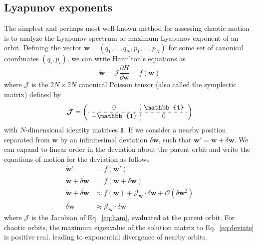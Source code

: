\documentclass[letterpaper,12pt,preprint]{aastex}
\newcommand{\bs}[1]{\boldsymbol{#1}}
\newcommand{\ident}{\mathbb{1}}
\newcommand{\jac}{\mathscr{J}}
\begin{document}
\subsection{Lyapunov exponents} \label{sec:lyap}

The simplest and perhaps most well-known method for assessing chaotic motion is to analyze the Lyapunov spectrum or maximum Lyapunov exponent of an orbit. Defining the vector $\bs{w} = (q_1,...,q_N,p_1,...,p_N)$ for some set of canonical coordinates $(q_i,p_i)$, we can write Hamilton's equations as 
\begin{equation}
	\dot{\bs{w}} = \bs{\mathcal{J}} \frac{\partial H}{\partial \bs{w}} = f(\bs{w}) \label{eq:ham}
\end{equation}
where $\bs{\mathcal{J}}$ is the $2N \times 2N$ canonical Poisson tensor (also called the symplectic matrix) defined by
\begin{equation}
	\bs{\mathcal{J}} = \left( \begin{array}{c:c} 0 & \ident \\ \hdashline -\ident & 0 \end{array} \right)
\end{equation}
with $N$-dimensional identity matrices $\ident$. If we consider a nearby position separated from $\bs{w}$ by an infinitesimal deviation $\delta \bs{w}$, such that $\bs{w}' = \bs{w} + \delta \bs{w}$. We can expand to linear order in the deviation about the parent orbit and write the equations of motion for the deviation as follows
\begin{align}
	\dot{\bs{w}}' &= f(\bs{w}')\\
	\dot{\bs{w}} + \dot{\delta \bs{w}} &= f(\bs{w} +  \delta \bs{w})\\
	\dot{\bs{w}} + \dot{\delta \bs{w}} &\approx f(\bs{w}) + \jac_{\bs{w}}\cdot\delta \bs{w} + \mathcal{O}(\delta \bs{w}^2)\\
	\dot{\delta \bs{w}} &\approx \jac_{\bs{w}} \cdot  \delta \bs{w}\label{eq:deviate}
\end{align}
where $\jac$ is the Jacobian of Eq.~\ref{eq:ham}, evaluated at the parent orbit. For chaotic orbits, the maximum eigenvalue of the solution matrix to Eq.~\ref{eq:deviate} is positive real, leading to exponential divergence of nearby orbits. 
\end{document}
